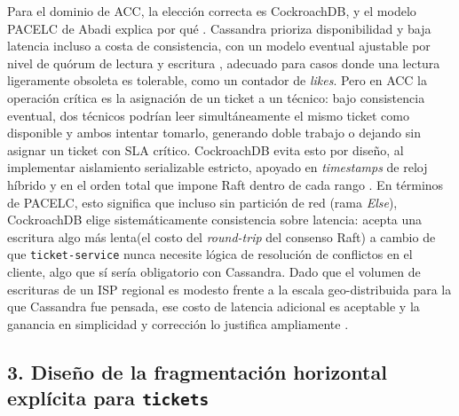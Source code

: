 \documentclass[11pt,a4paper]{article}
\begin{document}
Para el dominio de ACC, la elección correcta es CockroachDB, y el modelo
PACELC de Abadi explica por qué \cite{abadi2012}. Cassandra prioriza
disponibilidad y baja latencia incluso a costa de consistencia, con un
modelo eventual ajustable por nivel de quórum de lectura y escritura
\cite{lakshman2010}, adecuado para casos donde una lectura ligeramente
obsoleta es tolerable, como un contador de \emph{likes}. Pero en ACC la
operación crítica es la asignación de un ticket a un técnico: bajo
consistencia eventual, dos técnicos podrían leer simultáneamente el mismo
ticket como disponible y ambos intentar tomarlo, generando doble trabajo o
dejando sin asignar un ticket con SLA crítico. CockroachDB evita esto por
diseño, al implementar aislamiento serializable estricto, apoyado en
\emph{timestamps} de reloj híbrido y en el orden total que impone Raft
dentro de cada rango \cite{taft2020}. En términos de PACELC, esto significa
que incluso sin partición de red (rama \emph{Else}), CockroachDB elige
sistemáticamente consistencia sobre latencia: acepta una escritura algo más
lenta(el costo del \emph{round-trip} del consenso Raft) a cambio de
que \texttt{ticket-service} nunca necesite lógica de resolución de
conflictos en el cliente, algo que sí sería obligatorio con Cassandra. Dado
que el volumen de escrituras de un ISP regional es modesto frente a la
escala geo-distribuida para la que Cassandra fue pensada, ese costo de
latencia adicional es aceptable y la ganancia en simplicidad y corrección lo
justifica ampliamente \cite{viotti2016}.

\subsection*{3. Diseño de la fragmentación horizontal explícita para \texttt{tickets}}
\end{document}
